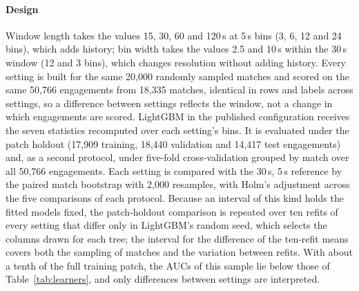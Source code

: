 \paragraph{Design}
Window length takes the values 15, 30, 60 and 120\,s at 5\,s bins (3, 6, 12 and 24 bins), which adds
history; bin width takes the values 2.5 and 10\,s within the 30\,s window (12 and 3 bins), which changes
resolution without adding history. Every setting is built for the same 20,000 randomly sampled matches and
scored on the same 50,766 engagements from 18,335 matches, identical in rows and labels across settings,
so a difference between settings reflects the window, not a change in which engagements are scored.
LightGBM in the published configuration receives the seven statistics recomputed over each setting's bins.
It is evaluated under the patch holdout (17,909 training, 18,440 validation and 14,417 test engagements)
and, as a second protocol, under five-fold cross-validation grouped by match over all 50,766 engagements.
Each setting is compared with the 30\,s, 5\,s reference by the paired match bootstrap with 2,000
resamples, with Holm's adjustment across the five comparisons of each protocol. Because an interval of
this kind holds the fitted models fixed, the patch-holdout comparison is repeated over ten refits of every
setting that differ only in LightGBM's random seed, which selects the columns drawn for each tree; the
interval for the difference of the ten-refit means covers both the sampling of matches and the variation
between refits. With about a tenth of the full training patch, the AUCs of this sample lie below those of
Table~\ref{tab:learners}, and only differences between settings are interpreted.

